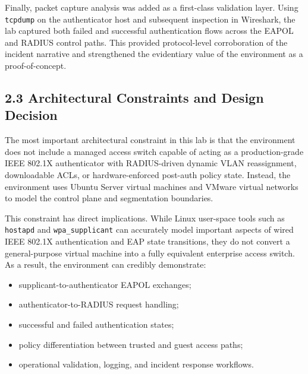 \documentclass[11pt]{article}
\begin{document}
Finally, packet capture analysis was added as a first-class validation layer. Using \texttt{tcpdump} on the authenticator host and subsequent inspection in Wireshark, the lab captured both failed and successful authentication flows across the EAPOL and RADIUS control paths. This provided protocol-level corroboration of the incident narrative and strengthened the evidentiary value of the environment as a proof-of-concept.


\subsection{2.3 Architectural Constraints and Design Decision}
\label{sec:architectural-constraints-and-design-decision}

The most important architectural constraint in this lab is that the environment does not include a managed access switch capable of acting as a production-grade IEEE 802.1X authenticator with RADIUS-driven dynamic VLAN reassignment, downloadable ACLs, or hardware-enforced post-auth policy state. Instead, the environment uses Ubuntu Server virtual machines and VMware virtual networks to model the control plane and segmentation boundaries.

This constraint has direct implications. While Linux user-space tools such as \texttt{hostapd} and \texttt{wpa\_supplicant} can accurately model important aspects of wired IEEE 802.1X authentication and EAP state transitions, they do not convert a general-purpose virtual machine into a fully equivalent enterprise access switch. As a result, the environment can credibly demonstrate:

\begin{itemize}
    \item supplicant-to-authenticator EAPOL exchanges;
    \item authenticator-to-RADIUS request handling;
    \item successful and failed authentication states;
    \item policy differentiation between trusted and guest access paths;
    \item operational validation, logging, and incident response workflows.
\end{itemize}
\end{document}
